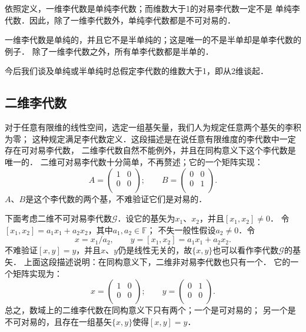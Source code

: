 依照定义，一维李代数是单纯李代数；而维数大于1的对易李代数一定不是
单纯李代数．因此，除了一维李代数外，单纯李代数都是不可对易的．

一维李代数是单纯的，并且它不是半单纯的；这是唯一的不是半单却是单李代数的例子．
除了一维李代数之外，所有单李代数都是半单的．

今后我们谈及{\kaishu 单纯}或{\kaishu 半单纯}时总假定李代数的维数大于1，即从2维谈起．


\subsection{二维李代数}\label{chlg:sec_2DLA}

对于任意有限维的线性空间，选定一组基矢量，我们人为规定任意两个基矢的李积为零；
这种规定满足李代数定义．这段描述是在说任意有限维度的李代数中一定存在可对易李代数，
二维李代数自然不能例外，并且在同构意义下这个李代数是唯一的．
二维可对易李代数十分简单，不再赘述；它的一个矩阵实现：
\begin{equation}
A=\left(
\begin{array}{cc}
    1 & 0 \\
    0 & 0 \\
\end{array}\right);\qquad
B=\left(
\begin{array}{cc}
    0 & 0 \\
    0 & 1 \\
\end{array}
\right).
\end{equation}
$A$、$B$是这个李代数的两个基，不难验证它们是对易的．


下面考虑二维不可对易李代数$\mathscr{G}$．设它的基矢为$x_1$、$x_2$，并且$[x_1,x_2]\neq 0$．
令$[x_1,x_2]= a_1 x_1+ a_2 x_2$，其中$a_1,a_2\in \mathbb{F}$；
不失一般性假设$a_2\neq 0$．令
\begin{equation}
    x = x_1 / a_2,\qquad
    y = [x_1,x_2]= a_1 x_1+ a_2 x_2.
\end{equation}
不难验证$[x,y]=y$，并且$x$、$y$仍是线性无关的，故$\{x,y\}$也可以看作李代数$\mathscr{G}$的基矢．
上面这段描述说明：在同构意义下，二维非对易李代数也只有一个．
它的一个矩阵实现为：
\begin{equation}
    x=\left(
    \begin{array}{cc}
        1 & 0 \\
        0 & 0 \\
    \end{array}\right);\qquad
    y=\left(
    \begin{array}{cc}
        0 & 1 \\
        0 & 0 \\
    \end{array}
    \right).
\end{equation}
总之，数域上的二维李代数在同构意义下只有两个；一个是可对易的；
另一个是不可对易的，且存在一组基矢$\{x,y\}$使得$[x,y]=y$．

